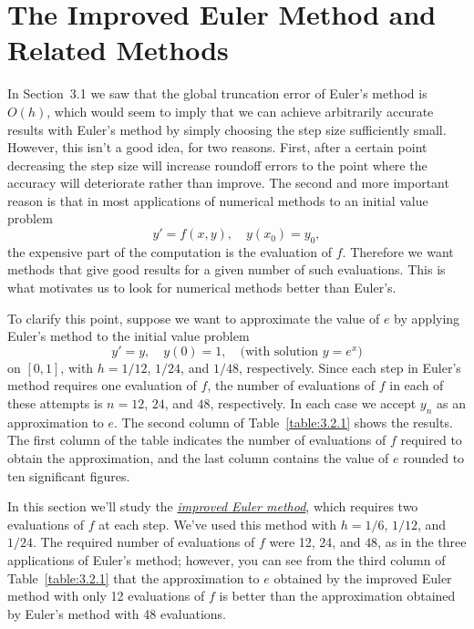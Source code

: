 \section{The Improved Euler Method and Related Methods}

\noindent
In Section~3.1 we saw that the global truncation error of Euler's method is $O(h)$, which would seem
to imply that we can achieve arbitrarily accurate results with Euler's method by simply choosing the
step size sufficiently small. However, this isn't a good idea, for two reasons. First, after a
certain point decreasing the step size will increase roundoff errors to the point where the accuracy
will deteriorate rather than improve. The second and more important reason is that in most
applications of numerical methods to an initial value problem
\begin{equation}
  \label{eq:3.2.1}y'=f(x,y),\quad y(x_{0})=y_{0},
\end{equation}
the expensive part of the computation is the evaluation of $f$. Therefore we want methods that give
good results for a given number of such evaluations. This is what motivates us to look for numerical
methods better than Euler's.

To clarify this point, suppose we want to approximate the value of $e$ by applying Euler's method to
the initial value problem
\[
  y'=y,\quad y(0)=1,\quad\mbox{(with solution $y=e^{x}$)}
\]
on $[0,1]$, with $h=1/12$, $1/24$, and $1/48$, respectively. Since each step in Euler's method
requires one evaluation of $f$, the number of evaluations of $f$ in each of these attempts is
$n=12$, $24$, and $48$, respectively. In each case we accept $y_{n}$ as an approximation to $e$. The
second column of Table~\ref{table:3.2.1} shows the results. The first column of the table indicates
the number of evaluations of $f$ required to obtain the approximation, and the last column contains
the value of $e$ rounded to ten significant figures.

In this section we'll study the
\href{https://mathshistory.st-andrews.ac.uk/Biographies/Euler/}{\color{blue}
\it improved Euler method\/}, which requires two evaluations of $f$ at each step. We've used this
method with $h=1/6$, $1/12$, and $1/24$. The required number of evaluations of $f$ were 12, 24, and
$48$, as in the three applications of Euler's method; however, you can see from the third column of
Table~\ref{table:3.2.1} that the approximation to $e$ obtained by the improved Euler method with
only 12 evaluations of $f$ is better than the approximation obtained by Euler's method with 48
evaluations.

